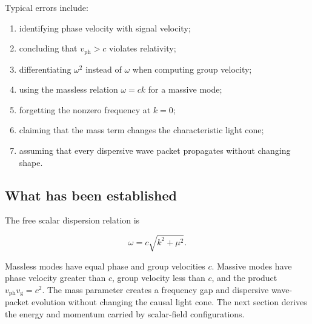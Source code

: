 Typical errors include:

\begin{enumerate}
    \item identifying phase velocity with signal velocity;
    \item concluding that \(v_{\mathrm{ph}}>c\) violates relativity;
    \item differentiating \(\omega^{2}\) instead of \(\omega\) when computing group velocity;
    \item using the massless relation \(\omega=ck\) for a massive mode;
    \item forgetting the nonzero frequency at \(k=0\);
    \item claiming that the mass term changes the characteristic light cone;
    \item assuming that every dispersive wave packet propagates without changing shape.
\end{enumerate}

\subsection{What has been established}

The free scalar dispersion relation is

\[
\omega=c\sqrt{k^{2}+\mu^{2}}.
\]

Massless modes have equal phase and group velocities \(c\). Massive modes have phase velocity greater than \(c\), group velocity less than \(c\), and the product \(v_{\mathrm{ph}}v_{\mathrm{g}}=c^{2}\). The mass parameter creates a frequency gap and dispersive wave-packet evolution without changing the causal light cone. The next section derives the energy and momentum carried by scalar-field configurations.

